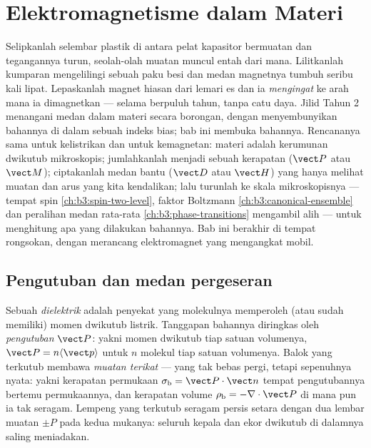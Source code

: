 \chapter{Elektromagnetisme dalam Materi}\label{ch:b3:electromagnetism-in-matter}


Selipkanlah selembar plastik di antara pelat kapasitor bermuatan dan
tegangannya turun, seolah-olah muatan muncul entah dari mana. Lilitkanlah
kumparan mengelilingi sebuah paku besi dan medan magnetnya tumbuh seribu
kali lipat. Lepaskanlah magnet hiasan dari lemari es dan ia \emph{mengingat}
ke arah mana ia dimagnetkan --- selama berpuluh tahun, tanpa catu daya.
Jilid Tahun 2 menangani medan dalam materi secara borongan, dengan
menyembunyikan bahannya di dalam sebuah indeks bias; bab ini membuka
bahannya. Rencananya sama untuk kelistrikan dan untuk kemagnetan: materi
adalah kerumunan dwikutub mikroskopis; jumlahkanlah menjadi sebuah
kerapatan ($\vect P$ atau $\vect M$); ciptakanlah medan bantu ($\vect D$
atau $\vect H$) yang hanya melihat muatan dan arus yang kita kendalikan;
lalu turunlah ke skala mikroskopisnya --- tempat spin
\cref{ch:b3:spin-two-level}, faktor Boltzmann
\cref{ch:b3:canonical-ensemble} dan peralihan medan rata-rata
\cref{ch:b3:phase-transitions} mengambil alih --- untuk menghitung apa
yang dilakukan bahannya. Bab ini berakhir di tempat rongsokan, dengan
merancang elektromagnet yang mengangkat mobil.

\section{Pengutuban dan medan pergeseran}

\begin{definition}\label{def:b3:electromagnetism-in-matter:polarisation}
Sebuah \emph{dielektrik} adalah penyekat yang molekulnya memperoleh (atau
sudah memiliki) momen dwikutub listrik. Tanggapan bahannya diringkas
oleh \emph{pengutuban} $\vect P$: yakni momen dwikutub tiap satuan
volumenya, $\vect P = n\langle\vect p\rangle$ untuk $n$ molekul tiap
satuan volumenya. Balok yang terkutub membawa \emph{muatan terikat} ---
yang tak bebas pergi, tetapi sepenuhnya nyata: yakni kerapatan permukaan
$\sigma_{\text{b}} = \vect P\cdot\vect n$ tempat pengutubannya
bertemu permukaannya, dan kerapatan volume $\rho_{\text{b}} =
-\nabla\cdot\vect P$ di mana pun ia tak seragam. Lempeng yang terkutub
seragam persis setara dengan dua lembar muatan $\pm P$
pada kedua mukanya: seluruh kepala dan ekor dwikutub di dalamnya saling meniadakan.
\end{definition}

